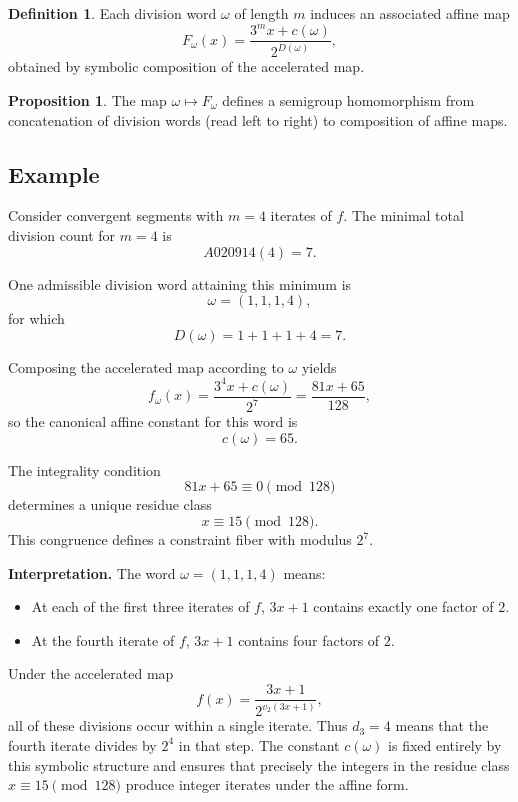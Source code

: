 \documentclass[12pt, oneside]{article}
\numberwithin{equation}{section}
\theoremstyle{definition}
\newtheorem{definition}{Definition}[section]
\newtheorem{proposition}{Proposition}[section]
\theoremstyle{plain}
\theoremstyle{remark}
\begin{document}
\begin{definition}
Each division word $\omega$ of length $m$ induces an associated affine map
\[
F_\omega(x) = \frac{3^m x + c(\omega)}{2^{D(\omega)}},
\]
obtained by symbolic composition of the accelerated map.
\end{definition}

\begin{proposition}
The map $\omega \mapsto F_\omega$ defines a semigroup homomorphism from
concatenation of division words (read left to right) to composition of affine maps.
\end{proposition}

\subsection{Example}

Consider convergent segments with $m=4$ iterates of $f$.  
The minimal total division count for $m=4$ is
\[
A020914(4) = 7.
\]

One admissible division word attaining this minimum is
\[
\omega = (1,1,1,4),
\]
for which
\[
D(\omega) = 1+1+1+4 = 7.
\]

Composing the accelerated map according to $\omega$ yields
\[
f_\omega(x)=\frac{3^4 x + c(\omega)}{2^7}
           = \frac{81x + 65}{128},
\]
so the canonical affine constant for this word is
\[
c(\omega)=65.
\]

The integrality condition
\[
81x + 65 \equiv 0 \pmod{128}
\]
determines a unique residue class
\[
x \equiv 15 \pmod{128}.
\]
This congruence defines a constraint fiber with modulus $2^7$.

\medskip

\noindent
\textbf{Interpretation.}
The word $\omega = (1,1,1,4)$ means:

\begin{itemize}
    \item At each of the first three iterates of $f$, $3x+1$ contains exactly one factor of $2$.
    \item At the fourth iterate of $f$, $3x+1$ contains four factors of $2$.
\end{itemize}

Under the accelerated map
\[
f(x)=\frac{3x+1}{2^{v_2(3x+1)}},
\]
all of these divisions occur within a single iterate. Thus $d_3=4$ means that
the fourth iterate divides by $2^4$ in that step. The constant $c(\omega)$ is
fixed entirely by this symbolic structure and ensures that precisely the
integers in the residue class $x \equiv 15 \pmod{128}$ produce integer iterates
under the affine form.
\end{document}
